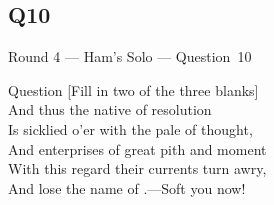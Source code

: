 \documentclass[11pt]{beamer}
\begin{document}
\subsection*{Q10}
\begin{frame}[t]{Round 4 --- Ham's Solo --- \mbox{Question 10}}
\vspace{-0.5em}
\begin{block}{Question}
[Fill in two of the three blanks]\\
And thus the native \textunderscore{}\textunderscore{}\textunderscore{}\textunderscore{}\textunderscore{} of resolution\\
Is sicklied o'er with the pale \textunderscore{}\textunderscore{}\textunderscore{}\textunderscore{}\textunderscore{} of thought,\\
And enterprises of great pith and moment\\
With this regard their currents turn awry,\\
And lose the name of \textunderscore{}\textunderscore{}\textunderscore{}\textunderscore{}\textunderscore{}.---Soft you now!
\end{block}
\end{frame}
\end{document}
